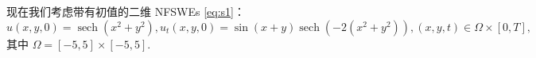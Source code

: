\begin{example}\label{ex:2}
    现在我们考虑带有初值的二维 NFSWEs \eqref{eq:s1}：
\begin{equation}
u(x, y, 0)=\operatorname{sech}\left(x^2+y^2\right), u_t(x, y, 0)=\sin (x+y) \operatorname{sech}\left(-2\left(x^2+y^2\right)\right),(x, y, t) \in \Omega \times[0, T],
\end{equation}
其中 $\Omega=[-5,5] \times[-5,5]$.
\end{example}
